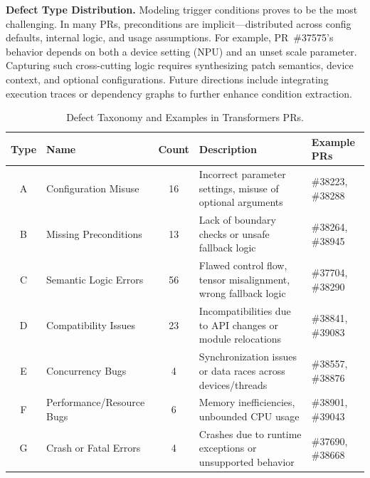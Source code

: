 \noindent\textbf{Defect Type Distribution.}
Modeling trigger conditions proves to be the most challenging.
In many PRs, preconditions are implicit—distributed across config defaults, internal logic, and usage assumptions.
For example, PR~\#37575’s behavior depends on both a device setting (NPU) and an unset scale parameter.
Capturing such cross-cutting logic requires synthesizing patch semantics, device context, and optional configurations.
Future directions include integrating execution traces or dependency graphs to further enhance condition extraction.

\begin{table}
\centering
\caption{Defect Taxonomy and Examples in Transformers PRs.}
\label{tab:defect-categories}
\begin{tabular}{clcll}
\toprule
\textbf{Type} & \textbf{Name} & \textbf{Count} & \textbf{Description} & \textbf{Example PRs} \\
\midrule
A & Configuration Misuse & 16 & Incorrect parameter settings, misuse of optional arguments & \#38223, \#38288 \\
B & Missing Preconditions & 13 & Lack of boundary checks or unsafe fallback logic & \#38264, \#38945 \\
C & Semantic Logic Errors & 56 & Flawed control flow, tensor misalignment, wrong fallback logic & \#37704, \#38290 \\
D & Compatibility Issues & 23 & Incompatibilities due to API changes or module relocations & \#38841, \#39083 \\
E & Concurrency Bugs & 4 & Synchronization issues or data races across devices/threads & \#38557, \#38876 \\
F & Performance/Resource Bugs & 6 & Memory inefficiencies, unbounded CPU usage & \#38901, \#39043 \\
G & Crash or Fatal Errors & 4 & Crashes due to runtime exceptions or unsupported behavior & \#37690, \#38668 \\
\bottomrule
\end{tabular}
\vspace{-0.3cm}
\end{table}


